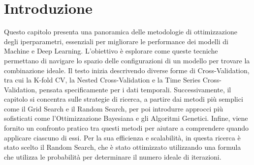 \documentclass[a4paper,12pt]{report}
\begin{document}
	\section{Introduzione}
	Questo capitolo presenta una panoramica delle metodologie di ottimizzazione degli iperparametri, essenziali per migliorare le performance dei modelli di Machine e Deep Learning. L'obiettivo è esplorare come queste tecniche permettano di navigare lo spazio delle configurazioni di un modello per trovare la combinazione ideale. Il testo inizia descrivendo diverse forme di Cross-Validation, tra cui la K-fold CV, la Nested Cross-Validation e la Time Series Cross-Validation, pensata specificamente per i dati temporali. Successivamente, il capitolo si concentra sulle strategie di ricerca, a partire dai metodi più semplici come il Grid Search e il Random Search, per poi introdurre approcci più sofisticati come l'Ottimizzazione Bayesiana e gli Algoritmi Genetici. Infine, viene fornito un confronto pratico tra questi metodi per aiutare a comprendere quando applicare ciascuno di essi. Per la sua efficienza e scalabilità, in questa ricerca è stato scelto il Random Search, che è stato ottimizzato utilizzando una formula che utilizza le probabilità per determinare il numero ideale di iterazioni.
	
\end{document}
